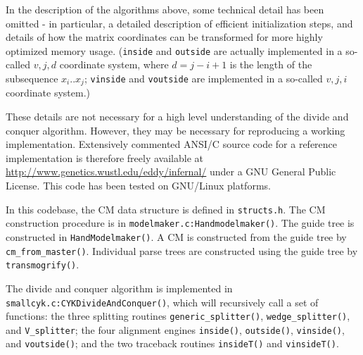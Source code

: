 \documentclass[11pt]{article}
\begin{document}
In the description of the algorithms above, some technical detail has
been omitted - in particular, a detailed description of efficient
initialization steps, and details of how the matrix coordinates can be
transformed for more highly optimized memory usage. (\texttt{inside}
and \texttt{outside} are actually implemented in a so-called $v,j,d$
coordinate system, where $d = j-i+1$ is the length of the subsequence
$x_i..x_j$; \texttt{vinside} and \texttt{voutside} are implemented in
a so-called $v,j,i$ coordinate system.) 

These details are not necessary for a high level understanding of the
divide and conquer algorithm. However, they may be necessary for
reproducing a working implementation. Extensively commented ANSI/C
source code for a reference implementation is therefore freely
available at \url{http://www.genetics.wustl.edu/eddy/infernal/} under
a GNU General Public License. This code has been tested on GNU/Linux
platforms.

In this codebase, the CM data structure is defined in
\texttt{structs.h}. The CM construction procedure is in
\texttt{modelmaker.c:Handmodelmaker()}. The guide tree is constructed
in \texttt{HandModelmaker()}. A CM is constructed from the guide tree
by \texttt{cm\_from\_master()}. Individual parse trees are constructed
using the guide tree by \texttt{transmogrify()}.

The divide and conquer algorithm is implemented in
\texttt{smallcyk.c:CYKDivideAndConquer()}, which will recursively call
a set of functions: the three splitting routines
\texttt{generic\_splitter()}, \texttt{wedge\_splitter()}, and
\texttt{V\_splitter}; the four alignment engines \texttt{inside()},
\texttt{outside()}, \texttt{vinside()}, and \texttt{voutside()}; and
the two traceback routines \texttt{insideT()} and \texttt{vinsideT()}.


\end{document}
